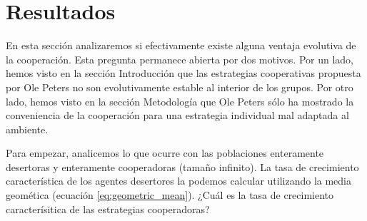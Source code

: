 \documentclass[a4paper,10pt]{article}
\begin{document}
\section{Resultados}

En esta sección analizaremos si efectivamente existe alguna ventaja evolutiva de la cooperación.
Esta pregunta permanece abierta por dos motivos.
Por un lado, hemos visto en la sección Introducción que las estrategias cooperativas propuesta por Ole Peters no son evolutivamente estable al interior de los grupos.
Por otro lado, hemos visto en la sección Metodología que Ole Peters sólo ha mostrado la conveniencia de la cooperación para una estrategia individual mal adaptada al ambiente.


Para empezar, analicemos lo que ocurre con las poblaciones enteramente desertoras y enteramente cooperadoras (tamaño infinito).
La tasa de crecimiento característica de los agentes desertores la podemos calcular utilizando la media geomética (ecuación \ref{eq:geometric_mean}).
¿Cuál es la tasa de crecimiento caracterísitica de las estrategias cooperadoras?

\end{document}
